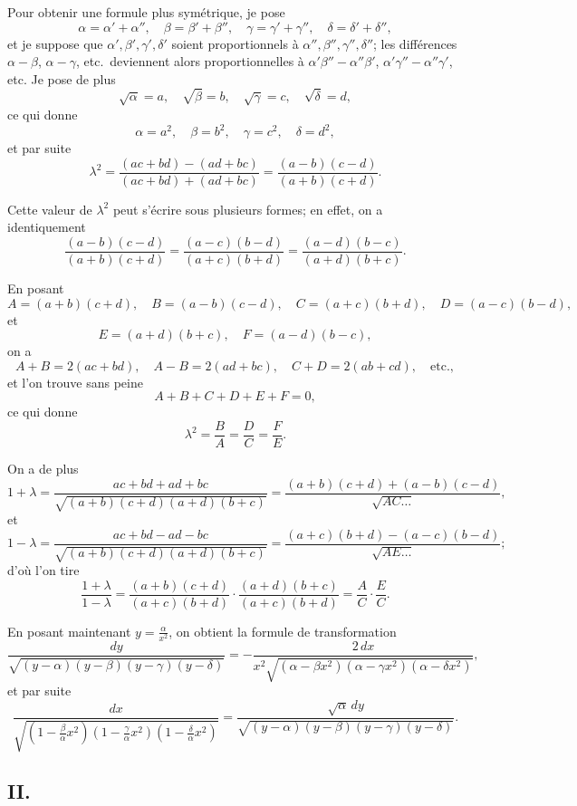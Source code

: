 \documentclass[11pt,a4paper]{book}
\begin{document}
Pour obtenir une formule plus symétrique, je pose
\[
\alpha = \alpha'+\alpha'', \quad \beta = \beta'+\beta'', \quad \gamma = \gamma'+\gamma'', \quad \delta = \delta'+\delta'',
\]
et je suppose que $\alpha',\beta',\gamma',\delta'$ soient proportionnels à $\alpha'',\beta'',\gamma'',\delta''$; les différences $\alpha-\beta$, $\alpha-\gamma$, etc.\ deviennent alors proportionnelles à $\alpha'\beta''-\alpha''\beta'$, $\alpha'\gamma''-\alpha''\gamma'$, etc. Je pose de plus
\[
\sqrt{\alpha} = a, \quad \sqrt{\beta} = b, \quad \sqrt{\gamma} = c, \quad \sqrt{\delta} = d,
\]
ce qui donne
\[
\alpha = a^2, \quad \beta = b^2, \quad \gamma = c^2, \quad \delta = d^2,
\]
et par suite
\[
\lambda^2 = \frac{(ac+bd)-(ad+bc)}{(ac+bd)+(ad+bc)} = \frac{(a-b)(c-d)}{(a+b)(c+d)}.
\]

\setcounter{page}{62}

Cette valeur de $\lambda^2$ peut s'écrire sous plusieurs formes; en effet, on a identiquement
\[
\frac{(a-b)(c-d)}{(a+b)(c+d)} = \frac{(a-c)(b-d)}{(a+c)(b+d)} = \frac{(a-d)(b-c)}{(a+d)(b+c)}.
\]

En posant
\[
A = (a+b)(c+d), \quad B = (a-b)(c-d), \quad C = (a+c)(b+d), \quad D = (a-c)(b-d),
\]
et
\[
E = (a+d)(b+c), \quad F = (a-d)(b-c),
\]
on a
\[
A+B = 2(ac+bd), \quad A-B = 2(ad+bc), \quad C+D = 2(ab+cd), \quad \text{etc.},
\]
et l'on trouve sans peine
\[
A+B+C+D+E+F = 0,
\]
ce qui donne
\[
\lambda^2 = \frac{B}{A} = \frac{D}{C} = \frac{F}{E}.
\]

\setcounter{page}{63}

On a de plus
\[
1+\lambda = \frac{ac+bd+ad+bc}{\sqrt{(a+b)(c+d)(a+d)(b+c)}} = \frac{(a+b)(c+d)+(a-b)(c-d)}{\sqrt{AC\ldots}},
\]
et
\[
1-\lambda = \frac{ac+bd-ad-bc}{\sqrt{(a+b)(c+d)(a+d)(b+c)}} = \frac{(a+c)(b+d)-(a-c)(b-d)}{\sqrt{AE\ldots}};
\]
d'où l'on tire
\[
\frac{1+\lambda}{1-\lambda} = \frac{(a+b)(c+d)}{(a+c)(b+d)} \cdot \frac{(a+d)(b+c)}{(a+c)(b+d)} = \frac{A}{C} \cdot \frac{E}{C}.
\]

En posant maintenant $y = \frac{\alpha}{x^2}$, on obtient la formule de transformation
\[
\frac{dy}{\sqrt{(y-\alpha)(y-\beta)(y-\gamma)(y-\delta)}}
= -\frac{2\,dx}{x^2\sqrt{(\alpha-\beta x^2)(\alpha-\gamma x^2)(\alpha-\delta x^2)}},
\]
et par suite
\[
\frac{dx}{\sqrt{(1-\frac{\beta}{\alpha}x^2)(1-\frac{\gamma}{\alpha}x^2)(1-\frac{\delta}{\alpha}x^2)}}
= \frac{\sqrt{\alpha}\,dy}{\sqrt{(y-\alpha)(y-\beta)(y-\gamma)(y-\delta)}}.
\]

\setcounter{page}{64}

\subsection*{II.}
\end{document}
